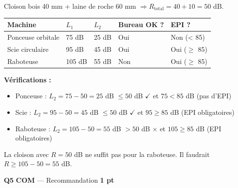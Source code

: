 \documentclass[a4paper,11pt]{article}
\newcommand{\pts}[1]{\hfill\textcolor{gris}{\small\textbf{#1}}}
\newcommand{\comp}[1]{\colorbox{blue!10}{\scriptsize\textbf{#1}}}
\begin{document}
\begin{reponsecorr}
Cloison bois 40 mm + laine de roche 60 mm $\Rightarrow R_{\text{total}} = 40 + 10 = 50$ dB.

\begin{center}
\renewcommand{\arraystretch}{1.5}
\begin{tabular}{|>{\centering\arraybackslash}m{3.5cm}|>{\centering\arraybackslash}m{2cm}|>{\centering\arraybackslash}m{2cm}|>{\centering\arraybackslash}m{2cm}|>{\centering\arraybackslash}m{2cm}|}
\hline
\textbf{Machine} & \textbf{$L_1$} & \textbf{$L_2$} & \textbf{Bureau OK ?} & \textbf{EPI ?} \\
\hline
Ponceuse orbitale & \textcolor{rouge}{75 dB} & \textcolor{rouge}{25 dB} & \textcolor{vertpro}{Oui} & \textcolor{vertpro}{Non (< 85)} \\
\hline
Scie circulaire & \textcolor{rouge}{95 dB} & \textcolor{rouge}{45 dB} & \textcolor{vertpro}{Oui} & \textcolor{rouge}{Oui ($\geq$ 85)} \\
\hline
Raboteuse & \textcolor{rouge}{105 dB} & \textcolor{rouge}{55 dB} & \textcolor{rouge}{Non} & \textcolor{rouge}{Oui ($\geq$ 85)} \\
\hline
\end{tabular}
\renewcommand{\arraystretch}{1}
\end{center}

\smallskip
\textbf{Vérifications :}
\begin{itemize}[nosep]
  \item Ponceuse : $L_2 = 75 - 50 = 25$ dB $\leq 50$ dB $\checkmark$ \quad et $75 < 85$ dB (pas d'EPI)
  \item Scie : $L_2 = 95 - 50 = 45$ dB $\leq 50$ dB $\checkmark$ \quad et $95 \geq 85$ dB (EPI obligatoires)
  \item Raboteuse : $L_2 = 105 - 50 = 55$ dB $> 50$ dB $\times$ \quad et $105 \geq 85$ dB (EPI obligatoires)
\end{itemize}

La cloison avec $R = 50$ dB ne suffit pas pour la raboteuse. Il faudrait $R \geq 105 - 50 = 55$ dB.
\end{reponsecorr}

\textbf{Q5} \comp{COM} — Recommandation \pts{1 pt}
\end{document}
